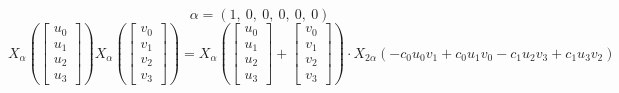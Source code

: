 \documentclass[11pt]{article}
\theoremstyle{definition}
\begin{document}
\[
\alpha = \left( 1, \  0, \  0, \  0, \  0, \  0\right)
\]
\[
X_{\alpha}\left(\left[\begin{matrix}u_{0}\\u_{1}\\u_{2}\\u_{3}\end{matrix}\right]\right) X_{\alpha}\left(\left[\begin{matrix}v_{0}\\v_{1}\\v_{2}\\v_{3}\end{matrix}\right]\right) = X_{\alpha}\left(\left[\begin{matrix}u_{0}\\u_{1}\\u_{2}\\u_{3}\end{matrix}\right] + \left[\begin{matrix}v_{0}\\v_{1}\\v_{2}\\v_{3}\end{matrix}\right]\right) \cdot X_{2\alpha}\left(- c_{0} u_{0} v_{1} + c_{0} u_{1} v_{0} - c_{1} u_{2} v_{3} + c_{1} u_{3} v_{2}\right)
\]
\end{document}
